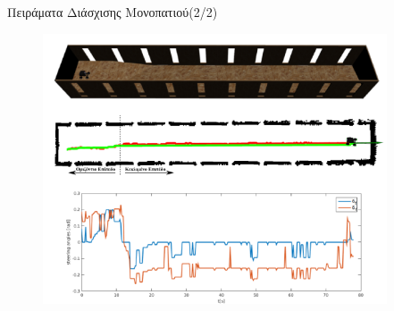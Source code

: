 \documentclass[10pt, compress, handout]{beamer} %
\begin{document}
\begin{frame}{Πειράματα Διάσχισης Μονοπατιού(2/2)}
	\begin{figure}
		\includegraphics[height=8cm]{Figures/path_tracking_slope_exp.png}
	\end{figure}		
\end{frame}
\end{document}
